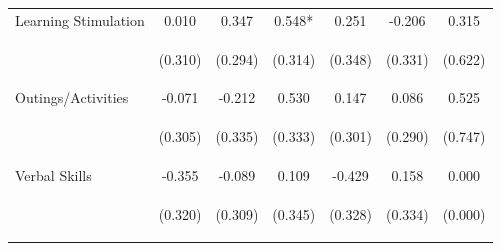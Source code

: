 \begin{tabular}{lcccccc}
\noalign{\smallskip}Learning Stimulation & 0.010 & 0.347 & 0.548* & 0.251 & -0.206 & 0.315\\
 & \begin{footnotesize}(0.310)\end{footnotesize} & \begin{footnotesize}(0.294)\end{footnotesize} & \begin{footnotesize}(0.314)\end{footnotesize} & \begin{footnotesize}(0.348)\end{footnotesize} & \begin{footnotesize}(0.331)\end{footnotesize} & \begin{footnotesize}(0.622)\end{footnotesize}\\
\noalign{\smallskip}Outings/Activities & -0.071 & -0.212 & 0.530 & 0.147 & 0.086 & 0.525\\
 & \begin{footnotesize}(0.305)\end{footnotesize} & \begin{footnotesize}(0.335)\end{footnotesize} & \begin{footnotesize}(0.333)\end{footnotesize} & \begin{footnotesize}(0.301)\end{footnotesize} & \begin{footnotesize}(0.290)\end{footnotesize} & \begin{footnotesize}(0.747)\end{footnotesize}\\
\noalign{\smallskip}Verbal Skills & -0.355 & -0.089 & 0.109 & -0.429 & 0.158 & 0.000\\
 & \begin{footnotesize}(0.320)\end{footnotesize} & \begin{footnotesize}(0.309)\end{footnotesize} & \begin{footnotesize}(0.345)\end{footnotesize} & \begin{footnotesize}(0.328)\end{footnotesize} & \begin{footnotesize}(0.334)\end{footnotesize} & \begin{footnotesize}(0.000)\end{footnotesize}\\

\end{tabular}
